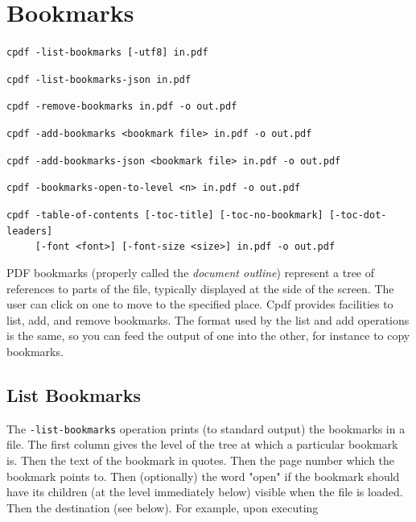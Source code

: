 \documentclass{book}
\begin{document}
\chapter{Bookmarks}\label{chap:6}

  \begin{framed}
  \small\noindent\verb!cpdf -list-bookmarks [-utf8] in.pdf!

  \vspace{1.5mm}
  \small\noindent\verb!cpdf -list-bookmarks-json in.pdf!

  \vspace{1.5mm}
  \small\noindent\verb!cpdf -remove-bookmarks in.pdf -o out.pdf!

  \vspace{1.5mm}
  \small\noindent\verb!cpdf -add-bookmarks <bookmark file> in.pdf -o out.pdf!

  \vspace{1.5mm}
  \small\noindent\verb!cpdf -add-bookmarks-json <bookmark file> in.pdf -o out.pdf!

  \vspace{1.5mm}
  \small\noindent\verb!cpdf -bookmarks-open-to-level <n> in.pdf -o out.pdf!

  \vspace{1.5mm}
  \small\noindent\verb!cpdf -table-of-contents [-toc-title] [-toc-no-bookmark] [-toc-dot-leaders]!\\
  \small\noindent\verb!     [-font <font>] [-font-size <size>] in.pdf -o out.pdf!

  \end{framed}


  PDF bookmarks (properly called the \textit{document outline}) represent a tree
of references to parts of the file, typically displayed at the side of the
screen. The user can click on one to move to the specified place. Cpdf provides
facilities to list, add, and remove bookmarks. The format used by the list and
add operations is the same, so you can feed the output of one into the other,
for instance to copy bookmarks.

  \section{List Bookmarks}
  The \texttt{-list-bookmarks} operation prints (to standard output) the
bookmarks in a file. The first column gives the level of the tree at which a
particular bookmark is. Then the text of the bookmark in quotes. Then the page
number which the bookmark points to. Then (optionally) the word "open" if the
bookmark should have its children (at the level immediately below) visible when
the file is loaded. Then the destination (see below). For example, upon executing
\end{document}
